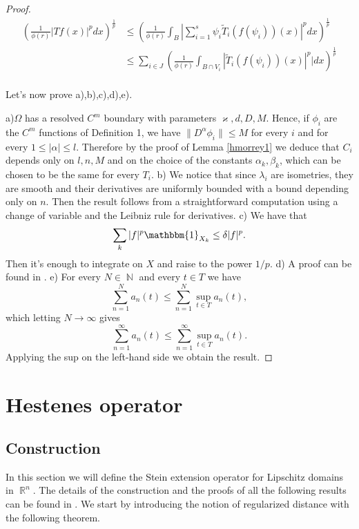 \documentclass[12pt]{article}
\theoremstyle{definition}
\DeclareMathOperator\rr{\mathbb{R}}
\DeclareMathOperator\nn{\mathbb{N}}
\begin{document}
\begin{proof}
\begin{align*}
\left( \frac{1}{\phi(r)}  |Tf(x)|^pdx  \right)^{\frac{1}{p}} &\le  \left( \frac{1}{\phi(r)} \int_B |\sum_{i=1}^s \psi_i \widetilde T_i(f(\psi_i))(x) |^pdx \right)^{\frac{1}{p}}\\
&\le \sum_{i \in J} \left( \frac{1}{\phi(r)} \int_{B \cap V_i} | \widetilde T_i(f(\psi_i))(x)|^p |dx \right)^{\frac{1}{p}}\\
\end{align*}


 Let's now prove a),b),c),d),e).

a)$\Omega$ has a resolved $C^m$ boundary with parameters $\varkappa,d,D,M$. Hence, if $\phi_i$ are the $C^m$ functions of Definition 1, we have $\| D^{\alpha}\phi_i \|\le M$ for every $i$ and for every $1\le|\alpha|\le l$. Therefore by the proof of Lemma \ref{hmorrey1} we deduce that $C_i$ depends only on $l,n,M$ and on the choice of the constants $\alpha_k,\beta_k$, which can be chosen to be the same for every $T_i$.
b) We notice that since $\lambda_i$ are isometries, they are smooth and their derivatives are uniformly bounded with a bound depending only on $n$. Then the result follows from a straightforward computation using a change of variable and the Leibniz rule for derivatives.
c) We have that 
\[ \sum_k |f|^p \mathbbm{1}_{X_k} \le \delta |f|^p. \]
Then it's enough to integrate on $X$ and raise to the power $1/p.$ d) A proof can be found in \cite[Lemma 13]{burenkov}. e) For every $N \in \nn$ and every $t \in T$ we have
\[ \sum_{n=1}^N a_n(t) \le \sum_{n=1}^N \sup_{t \in T} a_n(t),\]
which letting $N \rightarrow \infty$ gives
\[ \sum_{n=1}^\infty a_n(t) \le \sum_{n=1}^\infty \sup_{t \in T} a_n(t). \]
Applying the sup on the left-hand side we obtain the result.

\end{proof}
	
\section{Hestenes operator}

\subsection{Construction}
In this section we will define the Stein extension operator for Lipschitz domains in $\rr^n$. The details of the construction and the proofs of all the following results can be found in \cite[Section 2-3, Ch. VI]{stein}. We start by introducing the notion of regularized distance with the following theorem.
\end{document}
